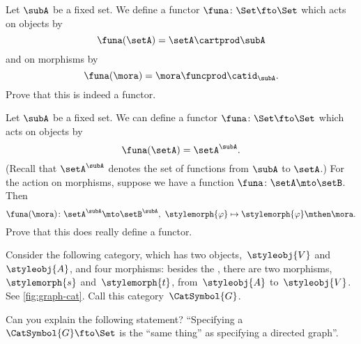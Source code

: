 \begin{gradedexercise}
    \label{ex:MultiplicationWithASet}
    Let $\subA$ be a fixed set.
    We define a functor $\funa \colon \Set \fto \Set$ which acts on objects by
    \begin{equation}
        \funa(\setA) = \setA \cartprod \subA
    \end{equation}
    and on morphisms by
    \begin{equation}
        \funa(\mora) = \mora \funcprod \catid_{\subA}.
    \end{equation}
    Prove that this is indeed a functor.
\end{gradedexercise}

\begin{gradedexercise}
    \label{ex:ExponentiationWithASet}
    Let $\subA$ be a fixed set.
    We can define a functor $\funa \colon \Set \fto \Set$ which acts on objects by
    \begin{equation}
        \funa(\setA) = \setA^\subA.
    \end{equation}
    (Recall that $\setA^\subA$ denotes the set of functions from $\subA$ to $\setA$.)
    For the action on morphisms, suppose we have a function $\funa \colon \setA \mto \setB$.
    Then
    \begin{equation}
        \funa(\mora) \colon \setA^\subA \mto \setB^\subA, \ \stylemorph{\varphi} \mapsto \stylemorph{\varphi} \mthen \mora.
    \end{equation}
    Prove that this does really define a functor.
\end{gradedexercise}

\begin{gradedexercise}
    \label{ex:GraphsViaFunctors}
    Consider the following category, which has two objects,~$\styleobj{V}$ and~$\styleobj{A}$, and four morphisms: besides the , there are two morphisms,~$\stylemorph{s}$ and~$\stylemorph{t}$, from~$\styleobj{A}$ to~$\styleobj{V}$.
    See \cref{fig:graph-cat}.
    Call this category~$\CatSymbol{G}$.

    Can you explain the following statement?
    ``Specifying a ~$\CatSymbol{G} \fto \Set$ is the ``same thing'' as specifying a directed graph''.
\end{gradedexercise}

\begin{marginfigure}
    \centering
    \caption{}
    \label{fig:graph-cat}
\end{marginfigure}


